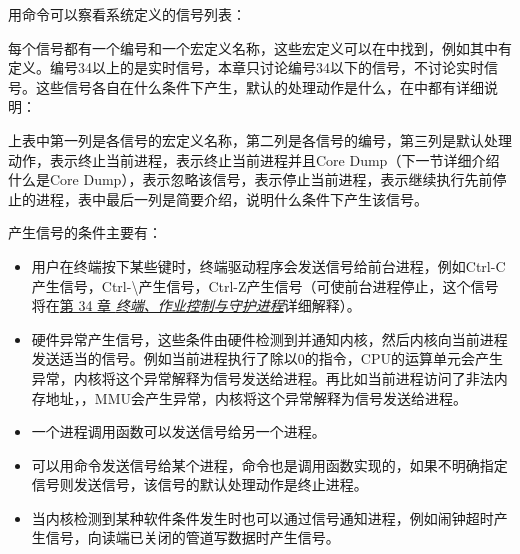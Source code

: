 用命令可以察看系统定义的信号列表：




每个信号都有一个编号和一个宏定义名称，这些宏定义可以在中找到，例如其中有定义。编号34以上的是实时信号，本章只讨论编号34以下的信号，不讨论实时信号。这些信号各自在什么条件下产生，默认的处理动作是什么，在中都有详细说明：




上表中第一列是各信号的宏定义名称，第二列是各信号的编号，第三列是默认处理动作，表示终止当前进程，表示终止当前进程并且Core Dump（下一节详细介绍什么是Core Dump），表示忽略该信号，表示停止当前进程，表示继续执行先前停止的进程，表中最后一列是简要介绍，说明什么条件下产生该信号。



产生信号的条件主要有：


\begin{itemize}

\item 用户在终端按下某些键时，终端驱动程序会发送信号给前台进程，例如Ctrl-C产生信号，Ctrl-\textbackslash{}产生信号，Ctrl-Z产生信号（可使前台进程停止，这个信号将在\hyperlink{db.ch34.id2890980}{第 34 章 \emph{终端、作业控制与守护进程}}详细解释）。

\item 硬件异常产生信号，这些条件由硬件检测到并通知内核，然后内核向当前进程发送适当的信号。例如当前进程执行了除以0的指令，CPU的运算单元会产生异常，内核将这个异常解释为信号发送给进程。再比如当前进程访问了非法内存地址，，MMU会产生异常，内核将这个异常解释为信号发送给进程。

\item 一个进程调用函数可以发送信号给另一个进程。

\item 可以用命令发送信号给某个进程，命令也是调用函数实现的，如果不明确指定信号则发送信号，该信号的默认处理动作是终止进程。

\item 当内核检测到某种软件条件发生时也可以通过信号通知进程，例如闹钟超时产生信号，向读端已关闭的管道写数据时产生信号。
\end{itemize}


